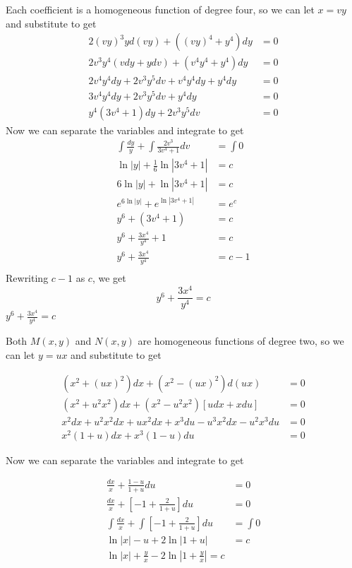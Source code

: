 \documentclass{report}
\begin{document}
\soln Each coefficient is a homogeneous function of degree four, so we can let $x=vy$ and substitute to get
\begin{align*}
    2(vy)^3yd(vy)+((vy)^4+y^4)dy &= 0 \\
    2v^3y^4(vdy+ydv)+(v^4y^4+y^4)dy &= 0 \\
    2v^4y^4dy+2v^3y^5dv+v^4y^4dy+y^4dy &= 0 \\
    3v^4y^4dy+2v^3y^5dv+y^4dy &= 0 \\
    y^4(3v^4+1)dy+2v^3y^5dv &= 0
\end{align*}
Now we can separate the variables and integrate to get
\begin{align*}
    \int \frac{dy}{y} + \int \frac{2v^3}{3v^4+1}dv &= \int 0 \\
    \ln{|y|} + \frac{1}{6}\ln{|3v^4+1|} &= c \\
    6\ln{|y|} + \ln{|3v^4+1|} &= c \\
    e^{6\ln{|y|}}+e^{\ln{|3v^4+1|}} &= e^c \\
    y^6+(3v^4+1) &= c \\
    y^6+\frac{3x^4}{y^4}+1 &= c \\
    y^6+\frac{3x^4}{y^4} &= c-1 \\
\end{align*}
Rewriting $c-1$ as $c$, we get
\[
    y^6+\frac{3x^4}{y^4} = c
\]
\ans $y^6+\frac{3x^4}{y^4} = c$

\medskip

\soln Both $M(x,y)$ and $N(x,y)$ are homogeneous functions of degree two, so we can let $y=ux$ and substitute to get

\begin{align*}
    (x^2+(ux)^2)dx+(x^2-(ux)^2)d(ux) &= 0 \\
    (x^2+u^2x^2)dx+(x^2-u^2x^2)[udx+xdu] &= 0 \\
    x^2dx+u^2x^2dx+ux^2dx+x^3du-u^3x^2dx-u^2x^3du &= 0 \\
    x^2(1+u)dx+x^3(1-u)du &= 0
\end{align*}

Now we can separate the variables and integrate to get

\begin{align*}
    \frac{dx}{x}+\frac{1-u}{1+u}du &= 0 \\
    \frac{dx}{x}+[-1+\frac{2}{1+u}]du &= 0 \\
    \int \frac{dx}{x}+\int [-1+\frac{2}{1+u}]du &= \int 0 \\
    \ln{|x|}-u+2\ln{|1+u|} &= c \\
    \ln{|x|}+\frac{y}{x}-2\ln{|1+\frac{y}{x}|} = c
\end{align*}
\end{document}
